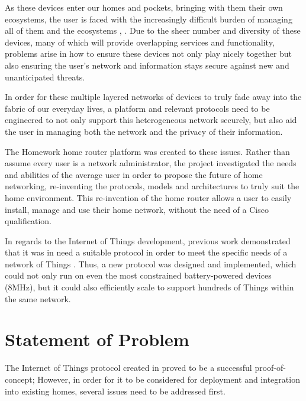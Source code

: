 \documentclass{mprop}
\begin{document}
As these devices enter our homes and pockets, bringing with them their own ecosystems, the user is faced with the increasingly difficult burden of managing all of them and the ecosystems \cite{brundell2011w}, \cite{brown2013multinet}. Due to the sheer number and diversity of these devices, many of which will provide overlapping services and functionality, problems arise in how to ensure these devices not only play nicely together but also ensuring the user's network and information stays secure against new and unanticipated threats.

In order for these multiple layered networks of devices to truly fade away into the fabric of our everyday lives, a platform and relevant protocols need to be engineered to not only support this heterogeneous network securely, but also aid the user in managing both the network and the privacy of their information.

The Homework home router platform was created to these issues. Rather than assume every user is a network administrator, the project investigated the needs and abilities of the average user in order to propose the future of home networking, re-inventing the protocols, models and architectures to truly suit the home environment. This re-invention of the home router allows a user to easily install, manage and use their home network, without the need of a Cisco qualification.

In regards to the Internet of Things development, previous work demonstrated that it was in need a suitable protocol in order to meet the specific needs of a network of Things \cite{KNoT}. Thus, a new protocol was designed and implemented, which could not only run on even the most constrained battery-powered devices (8MHz), but it could also efficiently scale to support hundreds of Things within the same network.




\section{Statement of Problem}

The Internet of Things protocol created in \cite{KNoT} proved to be a successful proof-of-concept; However, in order for it to be considered for deployment and integration into existing homes, several issues need to be addressed first.
\end{document}
